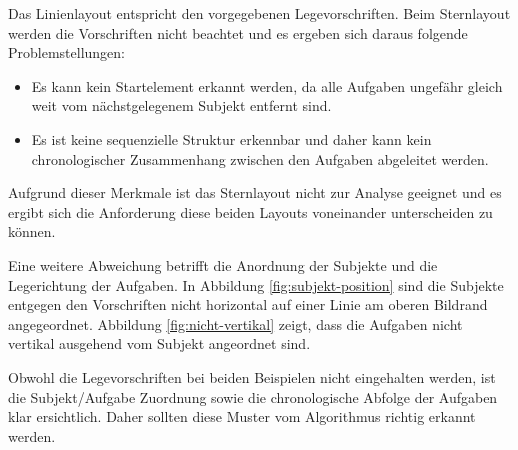 Das Linienlayout entspricht den vorgegebenen Legevorschriften. Beim Sternlayout werden die Vorschriften nicht beachtet und es ergeben sich daraus folgende Problemstellungen:
\begin{itemize}
	\item Es kann kein Startelement erkannt werden, da alle Aufgaben ungefähr gleich weit vom nächstgelegenem Subjekt entfernt sind.
	\item Es ist keine sequenzielle Struktur erkennbar und daher kann kein chronologischer Zusammenhang zwischen den Aufgaben abgeleitet werden.
\end{itemize}

Aufgrund dieser Merkmale ist das Sternlayout nicht zur Analyse geeignet und es ergibt sich die Anforderung diese beiden Layouts voneinander unterscheiden zu können.

Eine weitere Abweichung betrifft die Anordnung der Subjekte und die Legerichtung der Aufgaben. In Abbildung \ref{fig:subjekt-position} sind die Subjekte entgegen den Vorschriften nicht horizontal auf einer Linie am oberen Bildrand angegeordnet. Abbildung \ref{fig:nicht-vertikal} zeigt, dass die Aufgaben nicht vertikal ausgehend vom Subjekt angeordnet sind.

Obwohl die Legevorschriften bei beiden Beispielen nicht eingehalten werden, ist die Subjekt/Aufgabe Zuordnung sowie die chronologische Abfolge der Aufgaben klar ersichtlich. Daher sollten diese Muster vom Algorithmus richtig erkannt werden. 

